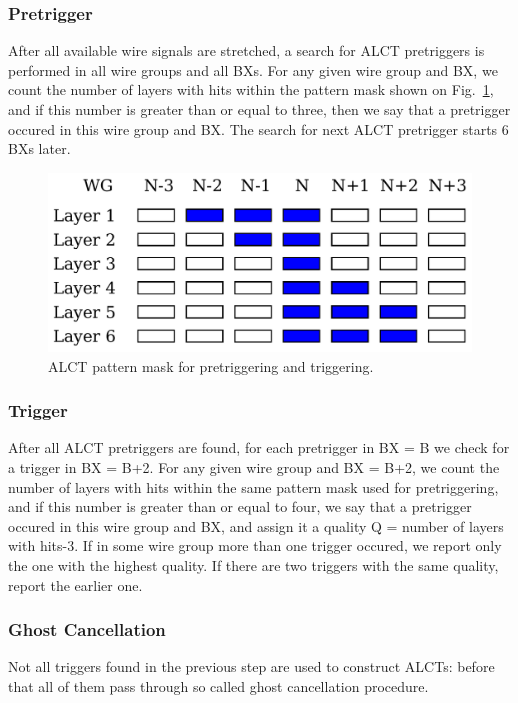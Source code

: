 \subsubsection{Pretrigger}

After all available wire signals are stretched, a search for ALCT pretriggers is performed in all wire groups and all BXs. For any given wire group and BX, we count the number of layers with hits within the pattern mask shown on Fig.~\ref{fig:alct_pretrigger}, and if this number is greater than or equal to three, then we say that a pretrigger occured in this wire group and BX. The search for next ALCT pretrigger starts 6 BXs later.

\begin{figure}[tbh]
        \begin{center}
                \includegraphics[width=0.45\linewidth]{figures/alct_pretrigger.pdf}
                \caption{ALCT pattern mask for pretriggering and triggering.}
                \label{fig:alct_pretrigger}
        \end{center}
\end{figure}

\subsubsection{Trigger}

After all ALCT pretriggers are found, for each pretrigger in BX = B we check for a trigger in BX = B+2. For any given wire group and BX = B+2, we count the number of layers with hits within the same pattern mask used for pretriggering, and if this number is greater than or equal to four, we say that a pretrigger occured in this wire group and BX, and assign it a quality Q = number of layers with hits-3. If in some wire group more than one trigger occured, we report only the one with the highest quality. If there are two triggers with the same quality, report the earlier one.

\subsubsection{Ghost Cancellation}

Not all triggers found in the previous step are used to construct ALCTs: before that all of them pass through so called ghost cancellation procedure.

